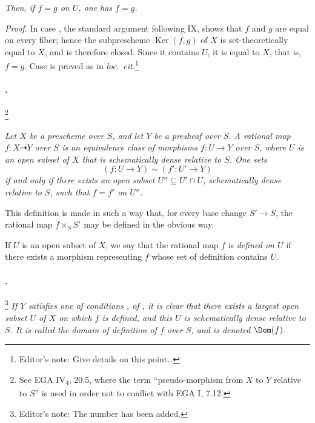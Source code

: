 \textit{Then, if \(f=g\) on \(U\), one has \(f=g\).}

\textit{Proof.}
In case , the standard argument following IX,  shows that
\(f\) and \(g\) are equal on every fiber; hence the subprescheme
\(\operatorname{Ker}(f,g)\) of \(X\) is set-theoretically equal to
\(X\), and is therefore closed. Since it contains \(U\), it is equal
to \(X\), that is, \(f=g\). Case  is proved as in
\textit{loc.\ cit.}\footnote{Editor's note: Give details on this
point\ldots}

\paragraph{.}
\begingroup
\renewcommand{\thefootnote}{*}
\footnote{See EGA IV\textsubscript{4}, 20.5, where the term
``pseudo-morphism from \(X\) to \(Y\) relative to \(S\)'' is used in
order not to conflict with EGA I, 7.12.}
\addtocounter{footnote}{-1}
\endgroup
\textit{Let \(X\) be a prescheme over \(S\), and let \(Y\) be a
presheaf over \(S\). A \emph{rational map}
\(f:X\dashrightarrow Y\) over \(S\) is an equivalence class of
morphisms \(f:U\to Y\) over \(S\), where \(U\) is an open subset of
\(X\) that is schematically dense relative to \(S\). One sets
\[
  (f:U\to Y)\sim(f':U'\to Y)
\]
if and only if there exists an open subset
\(U''\subseteq U'\cap U\), schematically dense relative to \(S\),
such that \(f=f'\) on \(U''\).}

This definition is made in such a way that, for every base change
\(S'\to S\), the rational map \(f\times_S S'\) may be defined in the
obvious way.

If \(U\) is an open subset of \(X\), we say that the rational map
\(f\) is \emph{defined on \(U\)} if there exists a morphism
representing \(f\) whose set of definition contains \(U\).

\paragraph{.}
\footnote{Editor's note: The number  has been added.}
\textit{If \(Y\) satisfies one of conditions ,  of , it is
clear that there exists a largest open subset \(U\) of \(X\) on
which \(f\) is defined, and this \(U\) is schematically dense
relative to \(S\). It is called the \emph{domain of definition of
\(f\) over \(S\)}, and is denoted \(\Dom(f)\).}

